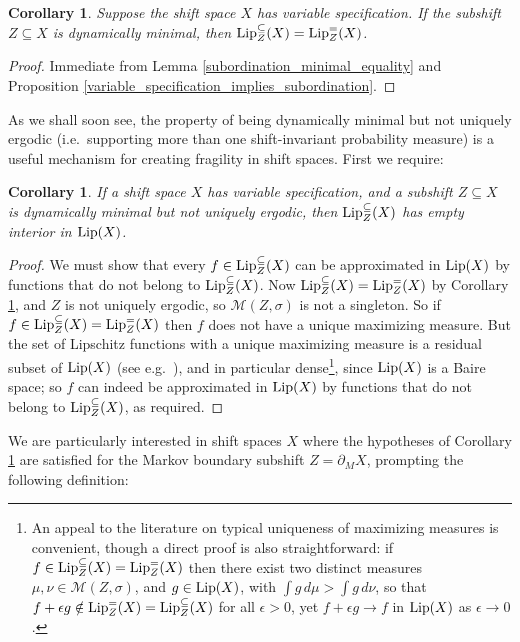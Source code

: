 \documentclass[reqno,11pt]{amsart}
\newtheorem{cor}[thm]{Corollary}
\theoremstyle{definition}
\theoremstyle{remark}
\theoremstyle{remark}
\def\m{\mathcal M}
\def\lip{{\rm Lip}}
\numberwithin{equation}{section}
\begin{document}
\begin{cor}\label{var_spec_minimal_equality}
Suppose the shift space $X$ has variable specification.
If the subshift $Z\subseteq X$ is dynamically minimal, then $\lip^\subseteq_Z(X)= \lip^=_Z(X)$.
\end{cor}
\begin{proof}
Immediate from
Lemma \ref{subordination_minimal_equality} and Proposition \ref{variable_specification_implies_subordination}.
\end{proof}


As we shall soon see, the property of being dynamically minimal but not uniquely ergodic
(i.e.~supporting more than one shift-invariant probability measure)
is a useful mechanism for creating fragility in shift spaces. First we require:

\begin{cor}\label{var_spec_Z_minimal_nue}
If a shift space $X$ has variable specification,
and a subshift $Z\subseteq X$ is dynamically minimal but not uniquely ergodic,
 then $\lip^\subseteq_Z(X)$  
has empty interior in $\lip(X)$.
\end{cor}
\begin{proof}
We must show that every $f\in\lip^\subseteq_Z(X)$ can be approximated in $\lip(X)$
by functions that do not belong to $\lip^\subseteq_Z(X)$. 
Now $\lip^\subseteq_Z(X) = \lip^=_Z(X)$ 
by Corollary \ref{var_spec_minimal_equality},
and $Z$ is not uniquely ergodic, so $\m(Z,\sigma)$ is not a singleton.
So if $f \in \lip^\subseteq_Z(X) = \lip^=_Z(X)$ then $f$ does not have a unique maximizing measure.
But the set of Lipschitz functions with a unique maximizing measure is a residual subset of $\lip(X)$
(see e.g.~\cite[Thm.~2.4]{Jen19}),
and in particular dense\footnote{An appeal to the literature on typical uniqueness of maximizing measures is convenient, though a direct proof is also 
straightforward:
if $f\in \lip^\subseteq_Z(X) = \lip^=_Z(X)$ then there exist two distinct measures $\mu,\nu\in \m(Z,\sigma)$,
and $g\in\lip(X)$, with $\int g\, d\mu > \int g\, d\nu$, so that $f+\epsilon g\notin \lip^=_Z(X) = \lip^\subseteq_Z(X)$ for all $\epsilon>0$,
yet $f+\epsilon g\to f$ in $\lip(X)$ as $\epsilon\to0$.}, since $\lip(X)$ is a Baire space;
so $f$ can indeed be  approximated in $\lip(X)$
by functions that do not belong to $\lip^\subseteq_Z(X)$, as required.
\end{proof}

We are particularly interested in shift spaces $X$ where the hypotheses of 
Corollary \ref{var_spec_Z_minimal_nue} are satisfied for the 
Markov boundary subshift $Z=\partial_M X$, prompting the following definition:
\end{document}
